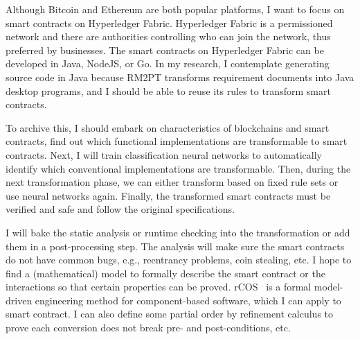 Although Bitcoin and Ethereum are both popular platforms, I want to focus on smart contracts on Hyperledger Fabric.
Hyperledger Fabric is a permissioned network and there are authorities controlling who can join the network, thus preferred by businesses.
The smart contracts on Hyperledger Fabric can be developed in Java, NodeJS, or Go.
In my research, I contemplate generating source code in Java because RM2PT transforms requirement documents into Java desktop programs,
and I should be able to reuse its rules to transform smart contracts.

To archive this, I should embark on characteristics of blockchains and smart contracts, find out which functional implementations are transformable to smart contracts.
Next, I will train classification neural networks to automatically identify which conventional implementations are transformable.
Then, during the next transformation phase, we can either transform based on fixed rule sets or use neural networks again.
Finally, the transformed smart contracts must be verified and safe and follow the original specifications.

I will bake the static analysis or runtime checking into the transformation or add them in a post-processing step.
The analysis will make sure the smart contracts do not have common bugs, e.g., reentrancy problems, coin stealing, etc.
I hope to find a (mathematical) model to formally describe the smart contract or the interactions so that certain properties can be proved.
rCOS~\cite{ke2012rcos} is a formal model-driven engineering method for component-based software, which I can apply to smart contract.
I can also define some partial order by refinement calculus to prove each conversion does not break pre- and post-conditions, etc.











